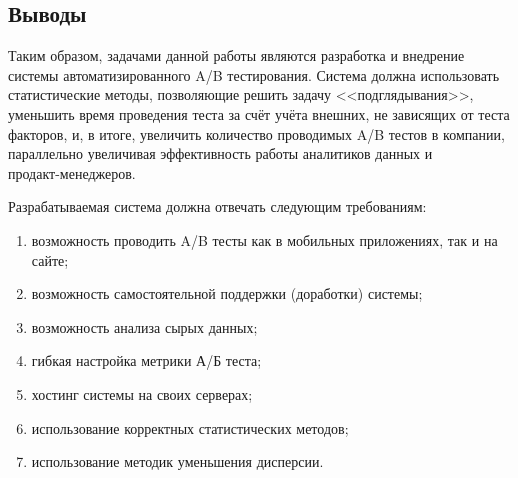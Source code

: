 \documentclass[../document.tex]{subfiles}
\begin{document}
	\subsection{Выводы}
	\par Таким образом, задачами данной работы являются разработка и внедрение системы автоматизированного A/B тестирования. Система должна использовать статистические методы, позволяющие решить задачу <<подглядывания>>, уменьшить время проведения теста за счёт учёта внешних, не зависящих от теста факторов, и, в итоге, увеличить количество проводимых A/B тестов в компании, параллельно увеличивая эффективность работы аналитиков данных и \\продакт-менеджеров.
	\par Разрабатываемая система должна отвечать следующим требованиям:
	\begin{enumerate}
		\item возможность проводить A/B тесты как в мобильных приложениях, так и на сайте;
		\item возможность самостоятельной поддержки (доработки) системы;
		\item возможность анализа сырых данных;
		\item гибкая настройка метрики А/Б теста;
		\item хостинг системы на своих серверах;
		\item использование корректных статистических методов;
		\item использование методик уменьшения дисперсии.
	\end{enumerate}
\end{document}
